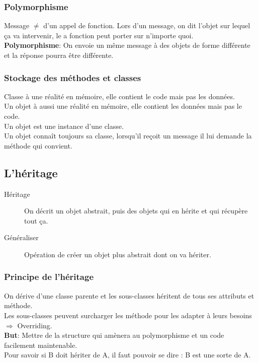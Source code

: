 \subsubsection{Polymorphisme}
Message $\neq$ d’un appel de fonction. Lors d’un message, on dit l’objet sur lequel ça va intervenir, le a fonction peut porter sur n’importe quoi.
\\\textbf{Polymorphisme}: On envoie un même message à des objets de forme différente et la réponse pourra être différente.



\subsubsection{Stockage des méthodes et classes}
Classe à une réalité en mémoire, elle contient le code mais pas les données. 
\\Un objet à aussi une réalité en mémoire, elle contient les données mais pas le code.
\\Un objet est une instance d’une classe.
\\Un objet connaît toujours sa classe, lorsqu’il reçoit un message il lui demande la méthode qui convient.



\subsection{L'héritage}
\begin{description}
	\item [Héritage] On décrit un objet abstrait, puis des objets qui en hérite et qui récupère tout ça.
	\item [Généraliser] Opération de créer un objet plus abstrait dont on va hériter.
\end{description}



\subsubsection{Principe de l’héritage}
On dérive d’une classe parente et les sous-classes héritent de tous ses attributs et méthode.
\\Les sous-classes peuvent surcharger les méthode pour les adapter à leurs besoins $\Rightarrow$ Overriding.
\\\textbf{But}: Mettre de la structure qui amènera au polymorphisme et un code facilement maintenable.
\\Pour savoir si B doit hériter de A, il faut pouvoir se dire : B est une sorte de A.



